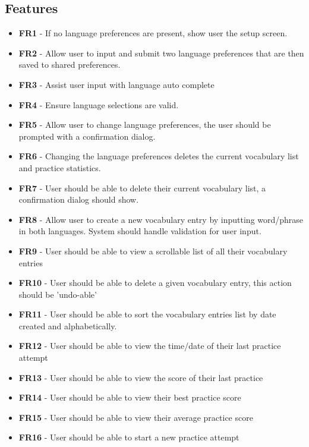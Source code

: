\documentclass[runningheads]{llncs}
\begin{document}
	\begin{subappendices}
		\renewcommand{\thesection}{\Alph{section}}
		
		\section{Features}
		\begin{itemize}
			\item \textbf{FR1} - If no language preferences are present, show user the setup screen.
			\item \textbf{FR2} - Allow user to input and submit two language preferences that are then saved to shared preferences.
			\item \textbf{FR3} - Assist user input with language auto complete
			\item \textbf{FR4} - Ensure language selections are valid.
			\item \textbf{FR5} - Allow user to change language preferences, the user should be prompted with a confirmation dialog.
			\item \textbf{FR6} - Changing the language preferences deletes the current vocabulary list and practice statistics.
			\item \textbf{FR7} - User should be able to delete their current vocabulary list, a confirmation dialog should show.
			\item \textbf{FR8} - Allow user to create a new vocabulary entry by inputting word/phrase in both languages. System should handle validation for user input.
			\item \textbf{FR9} - User should be able to view a scrollable list of all their vocabulary entries
			\item \textbf{FR10} - User should be able to delete a given vocabulary entry, this action should be 'undo-able'
			\item \textbf{FR11} - User should be able to sort the vocabulary entries list by date created and alphabetically.
			\item \textbf{FR12} - User should be able to view the time/date of their last practice attempt
			\item \textbf{FR13} - User should be able to view the score of their last practice
			\item \textbf{FR14} - User should be able to view their best practice score
			\item \textbf{FR15} - User should be able to view their average practice score
			\item \textbf{FR16} - User should be able to start a new practice attempt

\end{itemize}
\end{subappendices}
\end{document}

